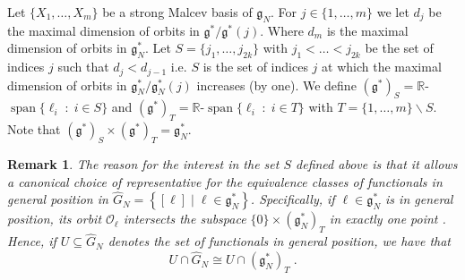 \documentclass[pdflatex,sn-mathphys-num]{sn-jnl}
\theoremstyle{thmstyletwo}
\theoremstyle{thmstyleone}
\theoremstyle{thmstyletwo}
\newtheorem{remark}[definition]{Remark}
\newcommand{\fancyg}{\mathfrak{g}}
\begin{document}
		
		Let $\{X_{1}, \ldots, X_{m}\}$ be a strong Malcev basis of $\fancyg_N$. For $j \in \{1, \ldots, m\}$ we let $d_j$ be the maximal dimension of orbits in $\fancyg^*/\fancyg^*(j)$. Where $d_m$ is the maximal dimension of orbits in $\fancyg_N^*$.
		Let $S = \{j_1, \ldots, j_{2k}\}$ with $j_1< \ldots< j_{2k}$ be the set of indices $j$ such that $d_j <d_{j-1}$ i.e. $S$ is the set of indices $j$ at which the maximal dimension of orbits in $\fancyg_N^*/\fancyg_N^*(j)$ increases (by one). We define $(\fancyg^*)_S = \mathbb{R}$-$\operatorname{span}\{\ell_i \;:\; i \in S\}$ and $(\fancyg^*)_T = \mathbb{R}$-$\operatorname{span}\{\ell_i \;:\; i \in T\}$ with $T =  \{1, \ldots, m\}\backslash S$. Note that $(\fancyg^*)_S \times (\fancyg^*)_T = \fancyg_N^*$.
		\begin{remark}\label{rem: choice of representant}
			The reason for the interest in the set $S$ defined above is that it allows a canonical choice of representative for the equivalence classes of functionals in general position in $\hat{G}_N = \left\{[\ell] \;|\; \ell \in \fancyg_N^*\right\}$. Specifically, if $\ell \in \fancyg_N^*$ is in general position, its orbit $\mathcal{O}_\ell$ intersects the subspace $\{0\} \times (\fancyg_N^*)_T$ in exactly one point \cite[Theorem~3.1.9]{corwin1990representations}. Hence, if $U \subseteq \hat{G}_N$ denotes the set of functionals in general position, we have that
			\begin{equation*}
				U \cap  \hat{G}_N \cong U \cap (\fancyg_N^*)_T \;.
			\end{equation*}
		\end{remark}
	
\end{document}
